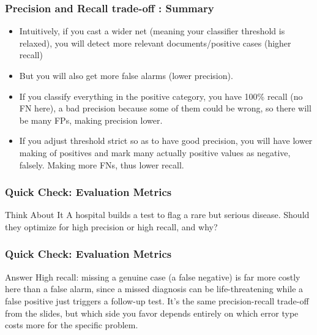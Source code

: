 



\begin{frame}[fragile]\frametitle{Precision and Recall trade-off : Summary}
\begin{itemize}
\item Intuitively, if you cast a wider net (meaning your classifier threshold is relaxed), you will detect more relevant documents/positive cases (higher recall) 
\item But you will also get more false alarms (lower precision). 
\item If you classify everything in the positive category, you have 100\% recall (no FN here), a bad precision because some of them could be wrong, so there will be many FPs, making precision lower.
\item If you adjust threshold strict so as to have good precision, you will have lower making of positives and mark many actually positive values as negative, falsely. Making more FNs, thus lower recall.
\end{itemize}
\end{frame}



\begin{frame}[fragile]\frametitle{Quick Check: Evaluation Metrics}
\begin{block}{Think About It}
A hospital builds a test to flag a rare but serious disease. Should they optimize for high precision or high recall, and why?
\end{block}
\end{frame}

\begin{frame}[fragile]\frametitle{Quick Check: Evaluation Metrics}
\begin{block}{Answer}
High recall: missing a genuine case (a false negative) is far more costly here than a false alarm, since a missed diagnosis can be life-threatening while a false positive just triggers a follow-up test. It's the same precision-recall trade-off from the slides, but which side you favor depends entirely on which error type costs more for the specific problem.
\end{block}
\end{frame}

